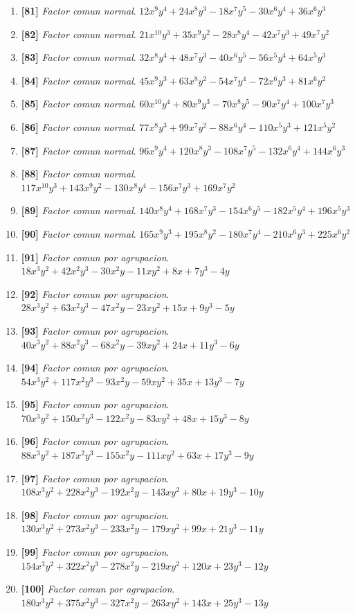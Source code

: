\documentclass[11pt,a4paper]{article}
\newcommand{\ejercicio}[3]{\item \textbf{[#1]} \textit{#2}. $ #3 $}
\begin{document}
\begin{enumerate}
\ejercicio{81}{Factor comun normal}{12 x^{9} y^{4} + 24 x^{8} y^{3} - 18 x^{7} y^{5} - 30 x^{6} y^{4} + 36 x^{6} y^{3}}
\ejercicio{82}{Factor comun normal}{21 x^{10} y^{3} + 35 x^{9} y^{2} - 28 x^{8} y^{4} - 42 x^{7} y^{3} + 49 x^{7} y^{2}}
\ejercicio{83}{Factor comun normal}{32 x^{8} y^{4} + 48 x^{7} y^{3} - 40 x^{6} y^{5} - 56 x^{5} y^{4} + 64 x^{5} y^{3}}
\ejercicio{84}{Factor comun normal}{45 x^{9} y^{3} + 63 x^{8} y^{2} - 54 x^{7} y^{4} - 72 x^{6} y^{3} + 81 x^{6} y^{2}}
\ejercicio{85}{Factor comun normal}{60 x^{10} y^{4} + 80 x^{9} y^{3} - 70 x^{8} y^{5} - 90 x^{7} y^{4} + 100 x^{7} y^{3}}
\ejercicio{86}{Factor comun normal}{77 x^{8} y^{3} + 99 x^{7} y^{2} - 88 x^{6} y^{4} - 110 x^{5} y^{3} + 121 x^{5} y^{2}}
\ejercicio{87}{Factor comun normal}{96 x^{9} y^{4} + 120 x^{8} y^{3} - 108 x^{7} y^{5} - 132 x^{6} y^{4} + 144 x^{6} y^{3}}
\ejercicio{88}{Factor comun normal}{117 x^{10} y^{3} + 143 x^{9} y^{2} - 130 x^{8} y^{4} - 156 x^{7} y^{3} + 169 x^{7} y^{2}}
\ejercicio{89}{Factor comun normal}{140 x^{8} y^{4} + 168 x^{7} y^{3} - 154 x^{6} y^{5} - 182 x^{5} y^{4} + 196 x^{5} y^{3}}
\ejercicio{90}{Factor comun normal}{165 x^{9} y^{3} + 195 x^{8} y^{2} - 180 x^{7} y^{4} - 210 x^{6} y^{3} + 225 x^{6} y^{2}}
\ejercicio{91}{Factor comun por agrupacion}{18 x^{3} y^{2} + 42 x^{2} y^{3} - 30 x^{2} y - 11 x y^{2} + 8 x + 7 y^{3} - 4 y}
\ejercicio{92}{Factor comun por agrupacion}{28 x^{3} y^{2} + 63 x^{2} y^{3} - 47 x^{2} y - 23 x y^{2} + 15 x + 9 y^{3} - 5 y}
\ejercicio{93}{Factor comun por agrupacion}{40 x^{3} y^{2} + 88 x^{2} y^{3} - 68 x^{2} y - 39 x y^{2} + 24 x + 11 y^{3} - 6 y}
\ejercicio{94}{Factor comun por agrupacion}{54 x^{3} y^{2} + 117 x^{2} y^{3} - 93 x^{2} y - 59 x y^{2} + 35 x + 13 y^{3} - 7 y}
\ejercicio{95}{Factor comun por agrupacion}{70 x^{3} y^{2} + 150 x^{2} y^{3} - 122 x^{2} y - 83 x y^{2} + 48 x + 15 y^{3} - 8 y}
\ejercicio{96}{Factor comun por agrupacion}{88 x^{3} y^{2} + 187 x^{2} y^{3} - 155 x^{2} y - 111 x y^{2} + 63 x + 17 y^{3} - 9 y}
\ejercicio{97}{Factor comun por agrupacion}{108 x^{3} y^{2} + 228 x^{2} y^{3} - 192 x^{2} y - 143 x y^{2} + 80 x + 19 y^{3} - 10 y}
\ejercicio{98}{Factor comun por agrupacion}{130 x^{3} y^{2} + 273 x^{2} y^{3} - 233 x^{2} y - 179 x y^{2} + 99 x + 21 y^{3} - 11 y}
\ejercicio{99}{Factor comun por agrupacion}{154 x^{3} y^{2} + 322 x^{2} y^{3} - 278 x^{2} y - 219 x y^{2} + 120 x + 23 y^{3} - 12 y}
\ejercicio{100}{Factor comun por agrupacion}{180 x^{3} y^{2} + 375 x^{2} y^{3} - 327 x^{2} y - 263 x y^{2} + 143 x + 25 y^{3} - 13 y}
\end{enumerate}
\end{document}
